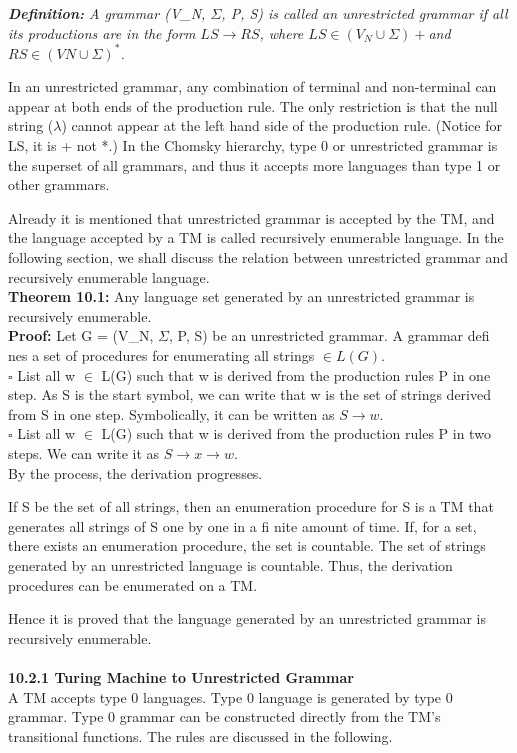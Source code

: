 \documentclass[b5paper,10pt]{article}
\begin{document}
 \textit{ \textbf{Definition:} A grammar (V_N, $\Sigma$, P, S) is called an unrestricted grammar if all its productions are in the form $LS \rightarrow RS$, where $LS \in (V_N \cup \Sigma)+ $and $RS \in (VN \cup \Sigma)^*$.}

In an unrestricted grammar, any combination of terminal and non-terminal can appear at both ends of
the production rule. The only restriction is that the null string ($\lambda$) cannot appear at the left hand side of
the production rule. (Notice for LS, it is + not *.) In the Chomsky hierarchy, type 0 or unrestricted grammar
is the superset of all grammars, and thus it accepts more languages than type 1 or other grammars.

Already it is mentioned that unrestricted grammar is accepted by the TM, and the language accepted
by a TM is called recursively enumerable language. In the following section, we shall discuss the relation
between unrestricted grammar and recursively enumerable language.
\\
\textbf{Theorem 10.1:} Any language set generated by an unrestricted grammar is recursively enumerable.
\\
\textbf{Proof:} Let G = (V_N, $\Sigma$, P, S) be an unrestricted grammar. A grammar defi nes a set of procedures for
enumerating all strings $\in L(G)$.\\
$\square$ List all w $\in$ L(G) such that w is derived from the production rules P in one step. As S is the start
symbol, we can write that w is the set of strings derived from S in one step. Symbolically, it can be
written as $S \rightarrow w$.\\
$\square$ List all w $\in$ L(G) such that w is derived from the production rules P in two steps. We can write it
as $S \rightarrow x \rightarrow w$.\\
By the process, the derivation progresses.

If S be the set of all strings, then an enumeration procedure for S is a TM that generates all strings
of S one by one in a fi nite amount of time. If, for a set, there exists an enumeration procedure, the set
is countable. The set of strings generated by an unrestricted language is countable. Thus, the derivation
procedures can be enumerated on a TM.

Hence it is proved that the language generated by an unrestricted grammar is recursively enumerable.\\\\
{\large\textbf{10.2.1 Turing Machine to Unrestricted Grammar}}\\
A TM accepts type 0 languages. Type 0 language is generated by type 0 grammar. Type 0 grammar can
be constructed directly from the TM’s transitional functions. The rules are discussed in the following.
\end{document}
